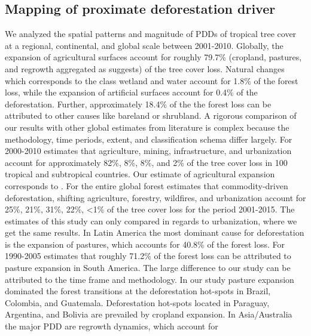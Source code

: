 		\subsection{Mapping of proximate deforestation driver}
		\label{subsec:discussion_proxy_deforestation_driver}
			We analyzed the spatial patterns and magnitude of \acp{PDD} of tropical tree cover at a regional, continental, and global scale between 2001-2010. Globally, the expansion of agricultural surfaces account for roughly 79.7\% (cropland, pastures, and regrowth aggregated as \citet{Geist2001} suggests) of the tree cover loss. Natural changes which corresponds to the class wetland and water account for 1.8\% of the forest loss, while the expansion of artificial surfaces account for 0.4\% of the deforestation. Further, approximately 18.4\% of the the forest loss can be attributed to other causes like bareland or shrubland. A rigorous comparison of our results with other global estimates from literature is complex because the methodology, time periods, extent, and classification schema differ largely. For 2000-2010 \citet{Hosonuma2012} estimates that agriculture, mining, infrastructure, and urbanization account for approximately 82\%, 8\%, 8\%, and 2\% of the tree cover loss in 100 tropical and subtropical countries. Our estimate of agricultural expansion corresponds to \citeauthor{Hosonuma2012}. For the entire global forest \citet{Curtis2018} estimates that commodity-driven deforestation, shifting agriculture, forestry, wildfires, and urbanization account for 25\%, 21\%, 31\%, 22\%, <1\% of the tree cover loss for the period 2001-2015. The estimates of this study can only compared in regards to urbanization, where we get the same results. In Latin America the most dominant cause for deforestation is the expansion of pastures, which accounts for 40.8\% of the forest loss. For 1990-2005 \citet{Sy2015} estimates that roughly 71.2\% of the forest loss can be attributed to pasture expansion in South America. The large difference to our study can be attributed to the time frame and methodology. In our study pasture expansion dominated the forest transitions at the deforestation hot-spots in Brazil, Colombia, and Guatemala. Deforestation hot-spots located in Paraguay, Argentina, and Bolivia are prevailed by cropland expansion. In Asia/Australia the major \ac{PDD} are regrowth dynamics, which account for 
